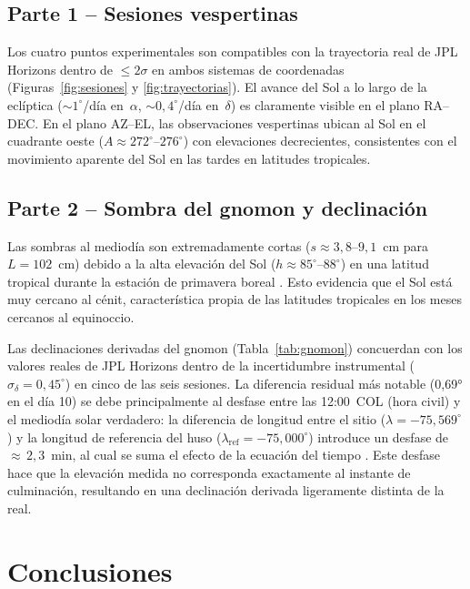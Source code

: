 \subsection{Parte 1 -- Sesiones vespertinas}

Los cuatro puntos experimentales son compatibles con la trayectoria real de JPL
Horizons \citep{Giorgini1996} dentro de $\leq 2\sigma$ en ambos sistemas de coordenadas
(Figuras~\ref{fig:sesiones} y \ref{fig:trayectorias}).
El avance del Sol a lo largo de la eclíptica (${\sim}1^\circ$/día en~$\alpha$,
${\sim}0{,}4^\circ$/día en~$\delta$) es claramente visible en el plano RA--DEC.
En el plano AZ--EL, las observaciones vespertinas ubican al Sol en el cuadrante oeste
($A \approx 272^\circ$--$276^\circ$) con elevaciones decrecientes, consistentes con el
movimiento aparente del Sol en las tardes en latitudes tropicales.

\subsection{Parte 2 -- Sombra del gnomon y declinación}

Las sombras al mediodía son extremadamente cortas ($s \approx 3{,}8$--$9{,}1$~cm para
$L = 102$~cm) debido a la alta elevación del Sol ($h \approx 85^\circ$--$88^\circ$)
en una latitud tropical durante la estación de primavera boreal
\citep{PortillaBarbosa2009}.
Esto evidencia que el Sol está muy cercano al cénit, característica propia de las
latitudes tropicales en los meses cercanos al equinoccio.

Las declinaciones derivadas del gnomon (Tabla~\ref{tab:gnomon}) concuerdan con los
valores reales de JPL Horizons \citep{Giorgini1996} dentro de la incertidumbre
instrumental ($\sigma_\delta = 0{,}45^\circ$) en cinco de las seis sesiones.
La diferencia residual más notable (0{,}69° en el día 10) se debe principalmente al
desfase entre las 12:00~COL (hora civil) y el mediodía solar verdadero: la diferencia
de longitud entre el sitio ($\lambda = -75{,}569^\circ$) y la longitud de referencia
del huso ($\lambda_\text{ref} = -75{,}000^\circ$) introduce un desfase de
${\approx}\,2{,}3$~min, al cual se suma el efecto de la ecuación del tiempo
\citep{Meeus1998}.
Este desfase hace que la elevación medida no corresponda exactamente al instante de
culminación, resultando en una declinación derivada ligeramente distinta de la real.

\section{Conclusiones}

